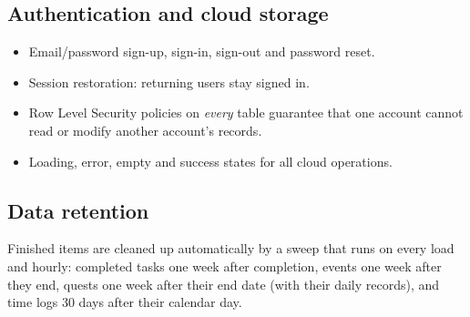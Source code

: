 \documentclass[12pt,a4paper]{article}
\begin{document}
\subsection{Authentication and cloud storage}
\begin{itemize}
  \item Email/password sign-up, sign-in, sign-out and password reset.
  \item Session restoration: returning users stay signed in.
  \item Row Level Security policies on \emph{every} table guarantee that
        one account cannot read or modify another account's records.
  \item Loading, error, empty and success states for all cloud operations.
\end{itemize}

\subsection{Data retention}
Finished items are cleaned up automatically by a sweep that runs on every
load and hourly: completed tasks one week after completion, events one week
after they end, quests one week after their end date (with their daily
records), and time logs 30 days after their calendar day.
\end{document}
